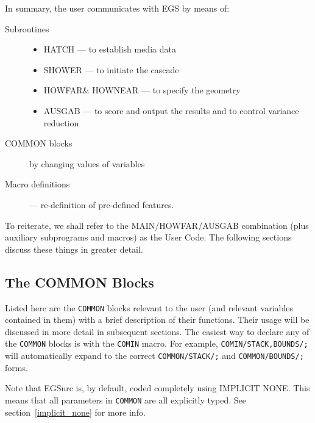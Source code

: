       In summary, the user communicates with EGS by means of:
\begin{description}
\item[Subroutines]\mbox{}
\begin{itemize}
\item HATCH  --- to establish media data

\item SHOWER --- to initiate the cascade

\item HOWFAR\& HOWNEAR --- to specify the geometry

\item AUSGAB --- to score and output the results and to control variance
reduction

\end{itemize}

\item[COMMON blocks]  by changing values of variables

\item[Macro definitions] --- re-definition of pre-defined features.
\end{description}

To reiterate, we shall refer to the MAIN/HOWFAR/AUSGAB combination
(plus auxiliary subprograms and macros) as the User Code.  The following
sections discuss these things in greater detail.

\clearpage

\subsection{ The COMMON Blocks}

\label{common_blocks} 
Listed here are the {\tt COMMON} blocks relevant to the user (and
relevant variables contained in them) with a brief description of their
functions.  Their usage will be discussed in more detail in subsequent
sections.  The easiest way to declare any of the {\tt COMMON} blocks is with
the {\tt COMIN} macro.  For example, {\tt COMIN/STACK,BOUNDS/;} will automatically
expand to the correct {\tt COMMON/STACK/;} and {\tt COMMON/BOUNDS/;} forms.

Note that EGSnrc is, by default, coded completely using IMPLICIT NONE. This
means that all parameters in {\tt COMMON} are all explicitly typed. See
section~\ref{implicit_none}  for more info.

